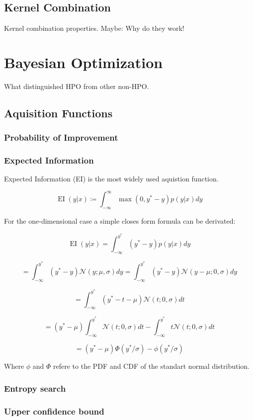 \documentclass[english]{article}
\newcommand{\EI}{\operatorname{EI}}
\newcommand{\normal}{\mathcal{N}}
\begin{document}
\subsection{Kernel Combination}
Kernel combination properties. Maybe: Why do they work!

\section{Bayesian Optimization}
What distinguished HPO from other non-HPO.

\subsection{Aquisition Functions}

\subsubsection{Probability of Improvement}
\subsubsection{Expected Information}

Expected Information (EI) is the most widely used aquistion function.

$$ \EI(y|x) \coloneqq \int_{-\infty}^{\infty} \max(0, y^*-y)p(y|x)dy $$

For the one-dimensional case a simple closes form formula can be derivated:

$$ \EI(y|x) = \int_{-\infty}^{y^*}(y^*-y)p(y|x)dy$$

$$ = \int_{-\infty}^{y^*}(y^*-y)\normal(y; \mu, \sigma)dy =
\int_{-\infty}^{y^*}(y^*-y)\normal(y-\mu; 0, \sigma)dy$$

$$ = \int_{-\infty}^{y^*}(y^*- t - \mu)\normal(t; 0, \sigma)dt $$ 

$$ = (y^*-\mu)\int_{-\infty}^{y^*}\normal(t; 0, \sigma)dt - \int_{-\infty}^{y^*}t\normal(t; 0, \sigma)dt$$

$$ = (y^*-\mu)\Phi(y^*/\sigma) - \phi(y^*/\sigma) $$

Where $\phi$ and $\Phi$ refere to the PDF and CDF of the standart normal distribution.

\subsubsection{Entropy search}
\subsubsection{Upper confidence bound}
\end{document}
